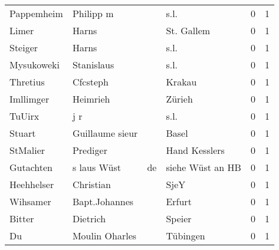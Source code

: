 \documentclass[10pt,a4paper,landscape]{article}
\begin{document}
\begin{longtable}{llllrr}
               Pappemheim &                          Philipp m &             &                                        s.l. &          0 &         1 \\
                    Limer &                              Harns &             &                                  St. Gallem &          0 &         1 \\
                  Steiger &                              Harns &             &                                        s.l. &          0 &         1 \\
               Mysukoweki &                         Stanislaus &             &                                        s.l. &          0 &         1 \\
                 Thretius &                           Cfcsteph &             &                                      Krakau &          0 &         1 \\
                Imllimger &                           Heimrieh &             &                                      Zürieh &          0 &         1 \\
                   TuUirx &                                j r &             &                                        s.l. &          0 &         1 \\
                   Stuart &                    Guillaume sieur &             &                                       Basel &          0 &         1 \\
                 StMalier &                           Prediger &             &                               Hand Kesslers &          0 &         1 \\
                Gutachten &                        s laus Wüst &          de &                            siehe Wüst an HB &          0 &         1 \\
               Heehhelser &                          Christian &             &                                        SjeY &          0 &         1 \\
                 Wihsamer &                      Bapt.Johannes &             &                                      Erfurt &          0 &         1 \\
                   Bitter &                           Dietrich &             &                                      Speier &          0 &         1 \\
                       Du &                     Moulin Oharles &             &                                    Tübingen &          0 &         1 \\

\end{longtable}
\end{document}
